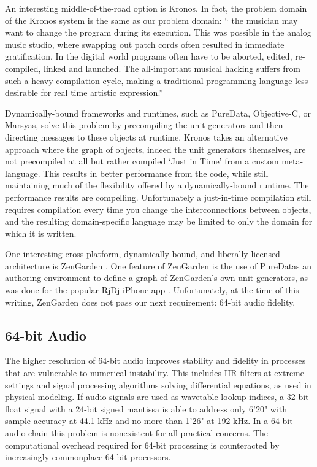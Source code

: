 \documentclass[twoside,10pt]{article}
\begin{document}

An interesting middle-of-the-road option is Kronos.  In fact, the problem domain of the Kronos system is the same as our problem domain: `` the musician may want to change the program during its execution. This was possible in the analog music studio, where swapping out patch cords often resulted in immediate gratification. In the digital world programs often have to be aborted, edited, re-compiled, linked and launched. The all-important musical hacking suffers from such a heavy compilation cycle, making a traditional programming language less desirable for real time artistic expression.'' \cite{Norilo:2009}

Dynamically-bound frameworks and runtimes, such as PureData, Objective-C, or Marsyas, solve this problem by precompiling the unit generators and then directing messages to these objects at runtime.  Kronos takes an alternative approach where the graph of objects, indeed the unit generators themselves, are not precompiled at all but rather compiled `Just in Time' from a custom meta-language. This results in better performance from the code, while still maintaining much of the flexibility offered by a dynamically-bound runtime.  The performance results are compelling.  Unfortunately a just-in-time compilation still requires compilation every time you change the interconnections between objects, and the resulting domain-specific language may be limited to only the domain for which it is written.

One interesting cross-platform, dynamically-bound, and liberally licensed architecture is ZenGarden \cite{web4}.  One feature of ZenGarden is the use of PureDatas an authoring environment to define a graph of ZenGarden's own unit generators, as was done for the popular RjDj iPhone app \cite{web5}.  Unfortunately, at the time of this writing, ZenGarden does not pass our next requirement: 64-bit audio fidelity.



\subsection{64-bit Audio} %

The higher resolution of 64-bit audio improves stability and fidelity in processes that are vulnerable to numerical instability.  This includes IIR filters at extreme settings and signal processing algorithms solving differential equations, as used in physical modeling.  If audio signals are used as wavetable lookup indices, a 32-bit float signal with a 24-bit signed mantissa is able to address only 6'20" with sample accuracy at 44.1 kHz and no more than 1'26" at 192 kHz. In a 64-bit audio chain this problem is nonexistent for all practical concerns. The computational overhead required for 64-bit processing is counteracted by increasingly commonplace 64-bit processors.
\end{document}
